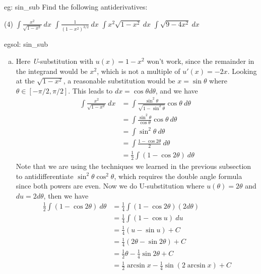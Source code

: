\begin{eg}[]{eg: sin_sub}
    Find the following antiderivatives:
    \begin{tasks}(4)
        \task $\int \frac{x^2}{\sqrt{1-x^2}}~dx$
        \task $\int \frac{1}{(1-x^2)^{3/2}}~dx$
        \task $\int x^2\sqrt{1-x^2}~dx$
        \task $\int \sqrt{9-4x^2}~dx$
    \end{tasks}
\end{eg}
\begin{egsol}[]{egsol: sin_sub}
    \begin{enumerate}[a)]
        \item Here \textit{U}-substitution with $u(x) = 1-x^2$ won't work, since the remainder in the integrand would be $x^2$, which is not a multiple of $u'(x) = -2x$.  Looking at the $\sqrt{1-x^2}$, a reasonable substitution would be $x = \sin \theta$ where $\theta \in [-\pi/2, \pi/2]$.  This leads to $dx = \cos \theta d\theta$, and we have
        \begin{align*}
            \int \frac{x^2}{\sqrt{1-x^2}}~dx &= \int \frac{\sin^2\theta}{\sqrt{1-\sin^2\theta}} \cos\theta~d\theta\\
            &= \int \frac{\sin^2\theta}{\cos \theta} \cos\theta~d\theta\\
            &= \int \sin^2\theta~d\theta \\
            &= \int \frac{1-\cos 2\theta}{2}~d\theta\\
            &= \frac{1}{2}\int (1-\cos 2\theta)~d\theta
        \end{align*}
        Note that we are using the techniques we learned in the previous subsection to antidifferentiate $\sin^2\theta \cos^2\theta$, which requires the double angle formula since both powers are even.  Now we do U-substitution where $u(\theta) = 2\theta$ and $du = 2d\theta$, then we have
        \begin{align*}
            \frac{1}{2}\int (1-\cos 2\theta)~d\theta &= \frac{1}{4}\int (1-\cos 2\theta)(2d\theta)\\
            &= \frac{1}{4}\int (1-\cos u)~du\\
            &= \frac{1}{4}(u-\sin u) + C\\
            &= \frac{1}{4}(2\theta - \sin 2\theta) + C\\
            &= \frac{1}{2}\theta - \frac{1}{4}\sin 2\theta + C\\
            &= \frac{1}{2}\arcsin x - \frac{1}{4}\sin (2\arcsin x) + C\\

\end{align*}
\end{enumerate}
\end{egsol}
